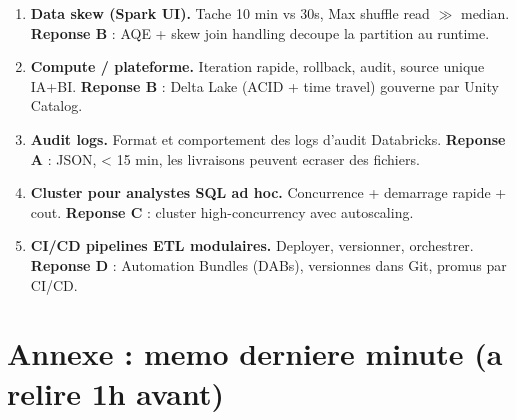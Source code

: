 \documentclass[11pt,a4paper]{article}
\begin{document}
\begin{enumerate}[leftmargin=*]
  \item \textbf{Data skew (Spark UI).} Tache 10 min vs 30s, Max shuffle read $\gg$ median.
        \textbf{Reponse B} : AQE + skew join handling decoupe la partition au runtime.
  \item \textbf{Compute / plateforme.} Iteration rapide, rollback, audit, source unique IA+BI.
        \textbf{Reponse B} : Delta Lake (ACID + time travel) gouverne par Unity Catalog.
  \item \textbf{Audit logs.} Format et comportement des logs d'audit Databricks.
        \textbf{Reponse A} : JSON, < 15 min, les livraisons peuvent ecraser des fichiers.
  \item \textbf{Cluster pour analystes SQL ad hoc.} Concurrence + demarrage rapide + cout.
        \textbf{Reponse C} : cluster high-concurrency avec autoscaling.
  \item \textbf{CI/CD pipelines ETL modulaires.} Deployer, versionner, orchestrer.
        \textbf{Reponse D} : Automation Bundles (DABs), versionnes dans Git, promus par CI/CD.
\end{enumerate}

\section*{Annexe : memo derniere minute (a relire 1h avant)}
\end{document}
